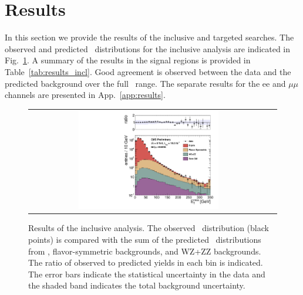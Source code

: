 \clearpage

\section{Results}

In this section we provide the results of the inclusive and targeted searches. 
The observed and predicted \MET\ distributions for the inclusive analysis are indicated in Fig.~\ref{fig:results_incl}. 
A summary of the results in the signal regions is provided in Table~\ref{tab:results_incl}. 
Good agreement is observed between the data and the predicted background over the full \MET\ range.
The separate results for the ee and $\mu\mu$ channels are presented in App.~\ref{app:results}.

\begin{figure}[!h]
\begin{center}
\begin{tabular}{cc}
\includegraphics[width=0.6\textwidth]{plots/pfmet_all_19fb.pdf}
\end{tabular}
\caption{Results of the inclusive analysis. The observed \MET\ distribution (black points) is compared with the sum of the predicted \MET\
distributions from \zjets, flavor-symmetric backgrounds, and WZ+ZZ backgrounds. The ratio of observed to predicted yields in each bin is
indicated. The error bars indicate the statistical uncertainty in the data and the shaded band indicates the total background uncertainty.
\label{fig:results_incl}
}
\end{center}
\end{figure}



